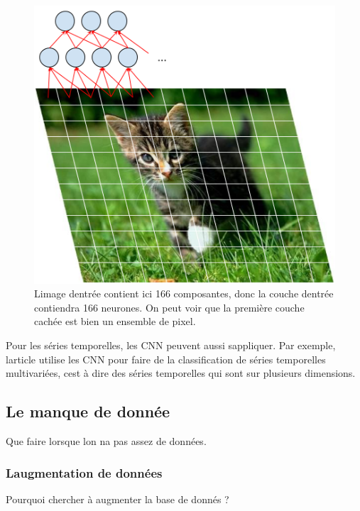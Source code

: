 \documentclass[11pt]{sdm}
\begin{document}
			\begin{figure}[!ht]
				\centering
				\includegraphics[natwidth=474,natheight=504,scale=0.6]{figures/cnnOnImage.png}
				\caption{L\textquotesingle image d\textquotesingle entr\'ee contient ici 166 composantes, donc la couche d\textquotesingle entr\'ee contiendra 166 neurones. On peut voir que la premi\`ere couche cach\'ee est bien un ensemble de pixel.}
				\label{fig:cnnChat}
			\end{figure}

			Pour les s\'eries temporelles, les CNN peuvent aussi s\textquotesingle appliquer. Par exemple, l\textquotesingle article \cite{zheng2014time} utilise les CNN pour faire de la classification de s\'eries temporelles multivari\'ees, c\textquotesingle est \`a dire des s\'eries temporelles qui sont sur plusieurs dimensions.

	\subsection{Le manque de donn\'ee}
		Que faire lorsque l\textquotesingle on n\textquotesingle a pas assez de donn\'ees.

		\subsubsection{L\textquotesingle augmentation de donn\'ees}
			\medbreak

			\begin{itshape}{Pourquoi chercher \`a augmenter la base de donn\'es ?}\end{itshape}
\end{document}
